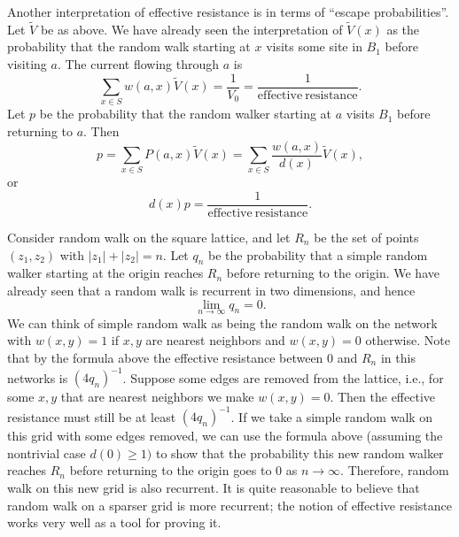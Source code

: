 \documentclass{stml-l}
\theoremstyle{definition}
\numberwithin{equation}{chapter}
\numberwithin{figure}{chapter}
\numberwithin{figure}{section}
\begin{document}
Another interpretation of effective resistance is in terms of
``escape probabilities''. Let $\tilde{V}$ be as above. We have
already seen the interpretation of $\tilde{V}(x)$ as the probability
that the random walk starting at $x$ visits some site in $B_{1}$
before visiting $a$. The current flowing through $a$ is
\begin{equation*}
\sum\limits_{x\in
S}w(a,x)\tilde{V}(x)=\frac{1}{V_{0}}=\frac{1}{\mathrm{effective\
resistance}}.
\end{equation*}
Let $p$ be the probability that the random walker starting at $a$
visits $B_{1}$ before returning to $a$. Then
\begin{equation*}
p=\sum\limits_{x\in S}P(a,x)\tilde{V}(x)=\sum\limits_{x\in
S}\frac{w(a,x)}{d(x)}\tilde{V}(x),
\end{equation*}
or
\begin{equation*}
d(x)p=\frac{1}{\mathrm{effective\ resistance}}.
\end{equation*}

Consider random walk on the square lattice, and let $R_{n}$ be the
set of points $(z_{1},z_{2})$ with $|z_{1}|+|z_{2}|=n$. Let $q_{n}$
be the probability that a simple random walker starting at the
origin reaches $R_{n}$ before returning to the origin. We have
already seen that a random walk is recurrent in two dimensions, and
hence
\begin{equation*}
\lim\limits_{n\rightarrow\infty}q_{n}=0.
\end{equation*}
We can think of simple random walk as being the random walk on the
network with $w(x,y)=1$ if $x,y$ are nearest neighbors and
$w(x,y)=0$ otherwise. Note that by the formula above the effective
resistance between $0$ and $R_{n}$ in this networks is
$(4q_{n})^{-1}$. Suppose some edges are removed from the lattice,
i.e., for some $x,y$ that are nearest neighbors we make $w(x,y)=0$.
Then the effective resistance must still be at least
$(4q_{n})^{-1}$. If we take a simple random walk on this grid with
some edges removed, we can use the formula above (assuming the
nontrivial case $d(0)\geq 1)$ to show that the probability this new
random walker reaches $R_{n}$ before returning to the origin goes to
$0$ as $ n\rightarrow\infty$. Therefore, random walk on this new
grid is also recurrent. It is quite reasonable to believe that
random walk on a sparser grid is more recurrent; the notion of
effective resistance works very well as a tool for proving it.
\end{document}

